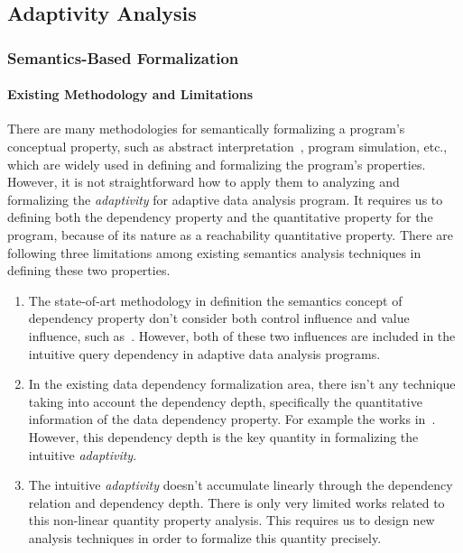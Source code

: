\subsection{Adaptivity Analysis}
\label{sec:intro-methodology-adapt}
\subsubsection{Semantics-Based Formalization}

\paragraph{Existing Methodology and Limitations}
There are many methodologies for semantically formalizing a program's conceptual property, such as abstract interpretation~\cite{CousotH78, CousotC77, Mine06, KincaidCBR18},
program simulation, etc., which are widely used in defining
and formalizing the program's properties.
However, it is not straightforward how to apply them to analyzing and formalizing the \emph{adaptivity}
for adaptive data analysis program.
It requires us to defining both the dependency property and the quantitative property for the program,
because of its nature as a reachability quantitative property.
There are following three limitations among existing semantics analysis techniques in defining these two properties.
\begin{enumerate}
\item
The state-of-art methodology in definition the semantics concept of dependency property don't
consider both control influence and value influence, such as~\cite{Cousot19a, DenningD77, AbadiBHR99, Mantel2004, CheneyAA11}.
However, both of these
two influences are included in the intuitive query dependency 
in adaptive data analysis programs.
\item In the existing data dependency formalization area, there isn't any technique taking into account
the dependency depth, specifically the quantitative information of the data dependency property. For example the works in~\cite{GoguenM84, AssafNSTT17, BartheDR11}.
However, this dependency depth is the key quantity in formalizing the intuitive \emph{adaptivity}.
\item The intuitive \emph{adaptivity} doesn't accumulate linearly through the dependency relation and 
dependency depth. There is only very limited works related to this non-linear quantity property analysis.
This requires us to design new analysis techniques in order to formalize this quantity precisely.
\end{enumerate}
%
